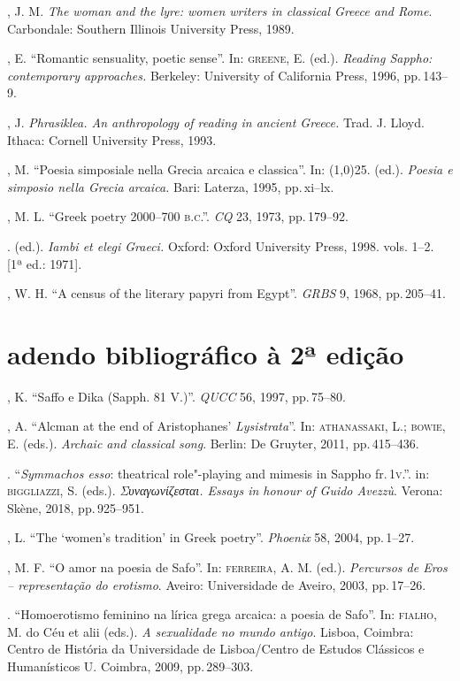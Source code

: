 \begin{bibliohedra}
, J. M. \textit{The woman and the lyre: women writers in
classical Greece and Rome}. Carbondale: Southern Illinois University Press,
1989.

, E. “Romantic sensuality, poetic sense”. In: \textsc{greene}, E.
(ed.). \textit{Reading Sappho: contemporary approaches.} Berkeley: University
of California Press, 1996, pp.\,143--9.

, J. \textit{Phrasiklea. An anthropology of reading in ancient
Greece.} Trad. J. Lloyd. Ithaca: Cornell University Press, 1993.

, M. “Poesia simposiale nella Grecia arcaica e classica”. In:
\line(1,0){25}. (ed.). \textit{Poesia e simposio nella Grecia arcaica.}
Bari: Laterza, 1995, pp.\,xi--lx.

, M. L. “Greek poetry 2000--700 \textsc{b.c.”.} \textit{CQ} 23, 1973,
pp.\,179--92.

\titidem. (ed.). \textit{Iambi et elegi Graeci.} Oxford: Oxford University
Press, 1998. vols. 1--2. {[}1ª ed.: 1971{]}.

, W. H. “A census of the literary papyri from Egypt”.
\textit{GRBS} 9, 1968, pp.\,205--41.


\pagebreak
\section*{adendo bibliográfico à 2ª edição}

, K. “Saffo e Dika (Sapph. 81 V.)”. \textit{QUCC} 56, 1997, pp.\,75--80.

, A. “Alcman at the end of Aristophanes' \textit{Lysistrata}”. In: \textsc{athanassaki}, L.; \textsc{bowie}, E. (eds.). \textit{Archaic and classical song}. Berlin: De Gruyter, 2011, pp.\,415--436.

\titidem.  “\textit{Symmachos esso}: theatrical role"-playing and mimesis in Sappho fr.\,1\textsc{v}.”. in: \textsc{biggliazzi}, S. (eds.). \textit{Συναγωνίζεσται. Essays in honour of Guido Avezzù}. Verona: Skène, 2018, pp.\,925--951.


, L. “The ‘women’s tradition’ in Greek poetry”. \textit{Phoenix} 58, 2004, pp.\,1--27.

, M. F. “O amor na poesia de Safo”. In: \textsc{ferreira}, A. M. (ed.). \textit{Percursos de Eros -- representação do erotismo}. Aveiro: Universidade de Aveiro, 2003, pp.\,17--26.

\titidem. “Homoerotismo feminino na lírica grega arcaica: a poesia de Safo”. In: \textsc{fialho}, M. do Céu et alii (eds.). \textit{A sexualidade no mundo antigo}. Lisboa, Coimbra: Centro de História da Universidade de Lisboa/Centro de Estudos Clássicos e Humanísticos U. Coimbra, 2009, pp.\,289--303. 


\end{bibliohedra}
